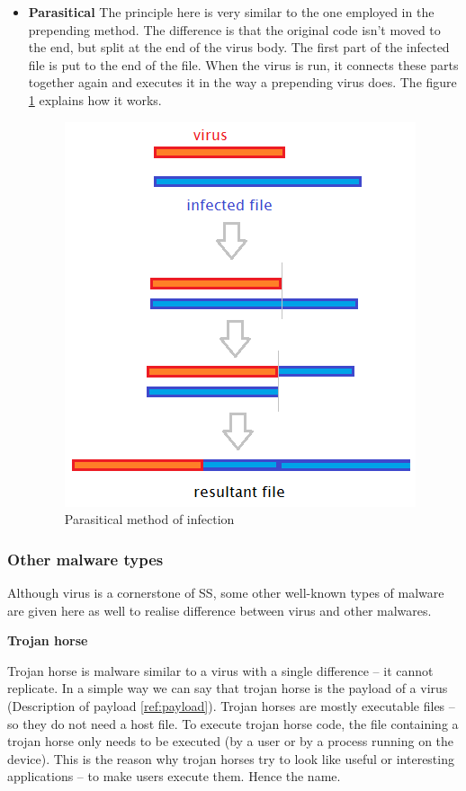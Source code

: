\documentclass[review]{elsarticle}
\begin{document}
\begin{itemize}
\item \textbf{Parasitical}
\label{page:parasitical}
The principle here is very similar to the one employed in the prepending method. The difference is that the original code isn't moved to the end, but split at the end of the virus body. The first part of the infected file is put to the end of the file. When the virus is run, it connects these parts together again and executes it in the way a prepending virus does. The figure \ref{pict:parasitical} explains how it works.

\begin{figure}[h!t]
\center
\caption{Parasitical method of infection}
\label{pict:parasitical}
\includegraphics[scale=0.6]{pict/parasitical.png}
\end{figure}
\end{itemize}

\subsubsection{Other malware types}
Although virus is a cornerstone of SS, some other well-known types of malware are given here as well to realise difference between virus and other malwares.

\textbf{Trojan horse}

Trojan horse is malware similar to a virus with a single difference -- it cannot replicate. In a simple way we can say that trojan horse is the payload of a virus (Description of payload \ref{ref:payload}). Trojan horses are mostly executable files -- so they do not need a host file. To execute trojan horse code, the file containing a trojan horse only needs to be executed (by a user or by a process running on the device).
This is the reason why trojan horses try to look like useful or interesting applications -- to make users execute them. Hence the name.
\end{document}
